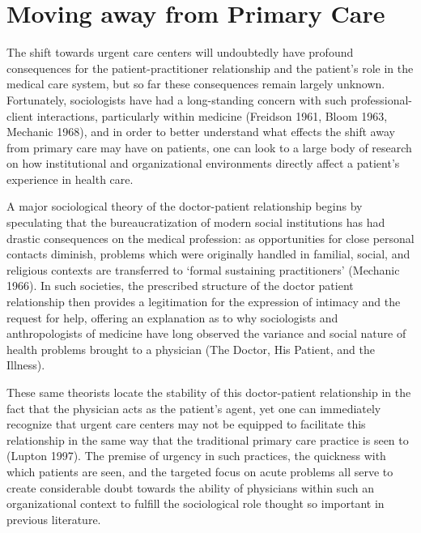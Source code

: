 \documentclass[12pt,twoside]{reedthesis}
\begin{document}
  \section*{Moving away from Primary
  Care}\label{moving-away-from-primary-care}
  
  The shift towards urgent care centers will undoubtedly have profound
  consequences for the patient-practitioner relationship and the patient's
  role in the medical care system, but so far these consequences remain
  largely unknown. Fortunately, sociologists have had a long-standing
  concern with such professional-client interactions, particularly within
  medicine (Freidson 1961, Bloom 1963, Mechanic 1968), and in order to
  better understand what effects the shift away from primary care may have
  on patients, one can look to a large body of research on how
  institutional and organizational environments directly affect a
  patient's experience in health care.
  
  A major sociological theory of the doctor-patient relationship begins by
  speculating that the bureaucratization of modern social institutions has
  had drastic consequences on the medical profession: as opportunities for
  close personal contacts diminish, problems which were originally handled
  in familial, social, and religious contexts are transferred to `formal
  sustaining practitioners' (Mechanic 1966). In such societies, the
  prescribed structure of the doctor patient relationship then provides a
  legitimation for the expression of intimacy and the request for help,
  offering an explanation as to why sociologists and anthropologists of
  medicine have long observed the variance and social nature of health
  problems brought to a physician (The Doctor, His Patient, and the
  Illness).
  
  These same theorists locate the stability of this doctor-patient
  relationship in the fact that the physician acts as the patient's agent,
  yet one can immediately recognize that urgent care centers may not be
  equipped to facilitate this relationship in the same way that the
  traditional primary care practice is seen to (Lupton 1997). The premise
  of urgency in such practices, the quickness with which patients are
  seen, and the targeted focus on acute problems all serve to create
  considerable doubt towards the ability of physicians within such an
  organizational context to fulfill the sociological role thought so
  important in previous literature.
  
\end{document}
